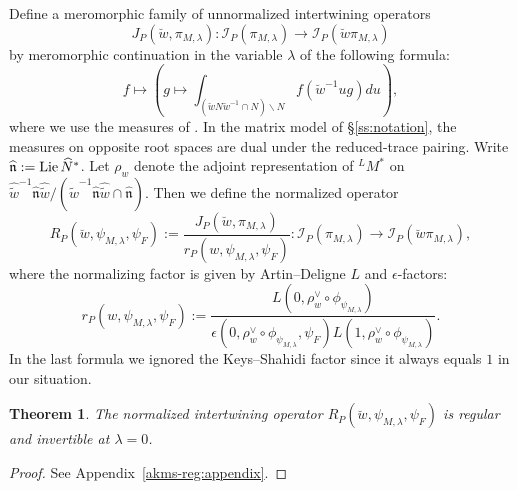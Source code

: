 \documentclass[11pt,reqno]{amsart}
\theoremstyle{plain}
\newtheorem{thm}{Theorem}[section]
\theoremstyle{definition}
\newcommand{\Lie}{\tu{Lie}\,}
\newcommand{\tu}{\textup}
\renewcommand{\hat}{\widehat}
\numberwithin{equation}{subsection}
\begin{document}
Define a meromorphic family of unnormalized intertwining operators
\[
J_P(\breve{w},\pi_{M,\lambda})\colon  \mathcal{I}_P(\pi_{M,\lambda}) \to \mathcal{I}_{P}(\breve{w}\pi_{M,\lambda})
\]
by meromorphic continuation in the variable $\lambda$ of the following formula:
\[
f\mapsto \left( g\mapsto \int_{(\breve w N \breve{w}^{-1}\cap N)\backslash N} f(\breve{w}^{-1} u  g) du\right),
\]
where we use the measures of \cite[\S2.2]{KMSW}. In the matrix model of \S\ref{ss:notation}, the measures on opposite root spaces are dual under the reduced-trace pairing.
Write $\hat{\mathfrak{n}}:=\Lie \hat{N}^*$. Let $\rho_{w}$ denote the adjoint representation of $^L M^*$ on 
$
 \widehat{\tilde w}^{-1}\hat{\mathfrak{n}}\widehat{\tilde w}/(\widehat{\tilde w}^{-1}\hat{\mathfrak{n}}\widehat{\tilde w}\cap \hat{\mathfrak{n}})
$.
Then we define the normalized operator 
\[
R_P(\breve{w},\psi_{M,\lambda}, \psi_F):=\frac{J_P(\breve{w},\pi_{M,\lambda})}{r_P(w,\psi_{M,\lambda}, \psi_F)}: \mathcal{I}_P(\pi_{M,\lambda}) \to \mathcal{I}_{P}(\breve{w}\pi_{M,\lambda}),
\]
where the normalizing factor is given by Artin--Deligne $L$ and $\epsilon$-factors:
\[
r_P(w,\psi_{M,\lambda}, \psi_F):=\frac{L(0,\rho^\vee_w\circ \phi_{\psi_{M,\lambda}})}{\epsilon(0,\rho^\vee_w\circ \phi_{\psi_{M,\lambda}}, \psi_F)L(1,\rho^\vee_w\circ \phi_{\psi_{M,\lambda}})}.
\]
In the last formula we ignored the Keys--Shahidi factor since it always equals $1$ in our situation.

\begin{thm}\label{thm:regularity}
The normalized intertwining operator $R_P(\breve{w},\psi_{M,\lambda}, \psi_F)$ is regular and invertible at $\lambda=0$.
\end{thm}
\begin{proof}
See Appendix~\ref{akms-reg:appendix}.
\end{proof}
\end{document}
